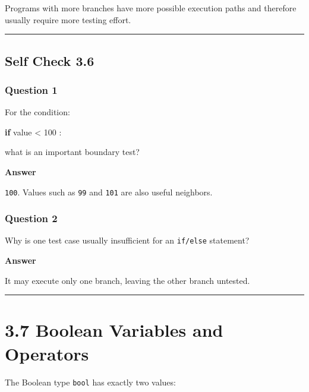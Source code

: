 \documentclass[
  11pt,
  a4paper,
]{article}
\newenvironment{Shaded}{}{}
\newcommand{\ControlFlowTok}[1]{\textcolor[rgb]{0.00,0.44,0.13}{\textbf{#1}}}
\newcommand{\DecValTok}[1]{\textcolor[rgb]{0.25,0.63,0.44}{#1}}
\newcommand{\NormalTok}[1]{#1}
\newcommand{\OperatorTok}[1]{\textcolor[rgb]{0.40,0.40,0.40}{#1}}
\begin{document}
Programs with more branches have more possible execution paths and
therefore usually require more testing effort.

\begin{center}\rule{0.5\linewidth}{0.5pt}\end{center}

\subsection{Self Check 3.6}\label{self-check-3.6}

\subsubsection{Question 1}\label{question-1-5}

For the condition:

\begin{Shaded}
\begin{Highlighting}[]
\ControlFlowTok{if}\NormalTok{ value }\OperatorTok{\textless{}} \DecValTok{100}\NormalTok{ :}
\end{Highlighting}
\end{Shaded}

what is an important boundary test?

\textbf{Answer}

\texttt{100}. Values such as \texttt{99} and \texttt{101} are also
useful neighbors.

\subsubsection{Question 2}\label{question-2-5}

Why is one test case usually insufficient for an \texttt{if/else}
statement?

\textbf{Answer}

It may execute only one branch, leaving the other branch untested.

\begin{center}\rule{0.5\linewidth}{0.5pt}\end{center}

\section{3.7 Boolean Variables and
Operators}\label{boolean-variables-and-operators}

The Boolean type \texttt{bool} has exactly two values:
\end{document}
